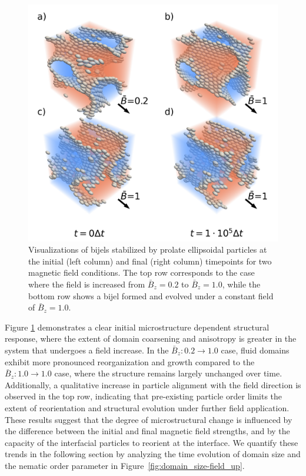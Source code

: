 \begin{figure}
\centering 
\includegraphics[scale=0.6]{../figures/results/paper2/microstructure_viz-field_up.png} 
\caption{Visualizations of bijels stabilized by prolate ellipsoidal particles at the initial (left column) and final (right column)
         timepoints for two magnetic field conditions. The top row corresponds to the case where the field is increased from 
         \(\bar{B}_z = 0.2\) to \(\bar{B}_z = 1.0\), while the bottom row shows a bijel formed and evolved under a constant field of 
         \(\bar{B}_z = 1.0\). }
\label{fig:microstructure_viz-field_up}
\end{figure}

Figure \ref{fig:microstructure_viz-field_up} demonstrates a clear initial microstructure dependent structural response, 
where the extent of domain coarsening and anisotropy is greater 
in the system that undergoes a field increase. In the \(\bar{B}_z: 0.2 \rightarrow 1.0\) case, fluid domains exhibit more pronounced reorganization and growth 
compared to the \(\bar{B}_z: 1.0 \rightarrow 1.0\) case, where the structure remains largely unchanged over time.
Additionally, a qualitative increase in particle alignment with the field direction is observed in the top row, indicating that pre-existing particle order 
limits the extent of reorientation and structural evolution under further field application. These results suggest that the degree of microstructural change 
is influenced by the difference between the initial and final magnetic field strengths, and by the capacity of the interfacial particles to reorient at the interface. 
We quantify these trends in the following section by analyzing the time evolution of domain size and the nematic order parameter in 
Figure~\ref{fig:domain_size-field_up}.


